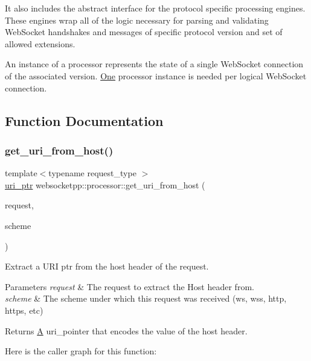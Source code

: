 It also includes the abstract interface for the protocol specific processing engines. These engines wrap all of the logic necessary for parsing and validating Web\+Socket handshakes and messages of specific protocol version and set of allowed extensions.

An instance of a processor represents the state of a single Web\+Socket connection of the associated version. \mbox{\hyperlink{struct_one}{One}} processor instance is needed per logical Web\+Socket connection. 

\subsection{Function Documentation}
\mbox{\label{namespacewebsocketpp_1_1processor_a5fa80687521dc24678e773fc3e71e0ce}} 
\subsubsection{\texorpdfstring{get\+\_\+uri\+\_\+from\+\_\+host()}{get\_uri\_from\_host()}}
{\footnotesize\ttfamily template$<$typename request\+\_\+type $>$ \\
\mbox{\hyperlink{namespacewebsocketpp_aae370ea5ac83a8ece7712cb39fc23f5b}{uri\+\_\+ptr}} websocketpp\+::processor\+::get\+\_\+uri\+\_\+from\+\_\+host (\begin{DoxyParamCaption}\item[{request\+\_\+type \&}]{request,  }\item[{std\+::string}]{scheme }\end{DoxyParamCaption})}



Extract a U\+RI ptr from the host header of the request. 


\begin{DoxyParams}{Parameters}
{\em request} & The request to extract the Host header from.\\
\hline
{\em scheme} & The scheme under which this request was received (ws, wss, http, https, etc)\\
\hline
\end{DoxyParams}
\begin{DoxyReturn}{Returns}
\mbox{\hyperlink{struct_a}{A}} uri\+\_\+pointer that encodes the value of the host header. 
\end{DoxyReturn}
Here is the caller graph for this function\+:
\mbox{\label{namespacewebsocketpp_1_1processor_a1a0e5e7b10b24ff5ab836dc543826934}} 
